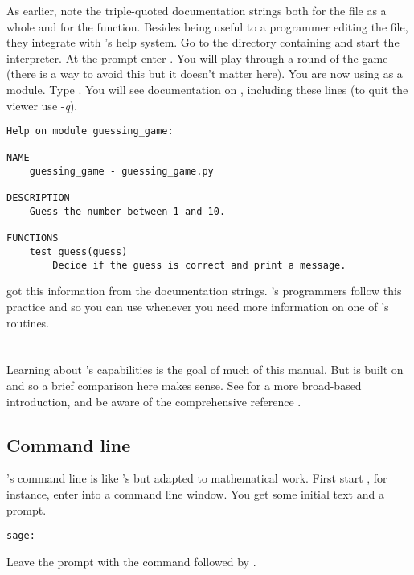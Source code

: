 As earlier, note the triple-quoted documentation strings both for the 
file as a whole and for the function.
Besides being useful to a programmer editing the file, 
they integrate with \python's help system. 
Go to the directory containing  and start 
the \python{} interpreter.
At the \inlinecode{>>>} prompt enter .
You will play through a round of the game (there is a way to avoid this
but it doesn't matter here).
You are now using  as a module.
Type
.
You will see documentation on , 
including these lines
(to quit the viewer use -\textit{q}).
\begin{lstlisting}
Help on module guessing_game:

NAME
    guessing_game - guessing_game.py

DESCRIPTION
    Guess the number between 1 and 10.

FUNCTIONS
    test_guess(guess)
        Decide if the guess is correct and print a message.
\end{lstlisting}
\python{} got this information from the documentation strings.
\Sage's programmers follow this practice and so 
you can use  
whenever you need more information on one of 
\Sage's routines.





\section{\Sage}
Learning about \Sage's capabilities is the goal of much of this manual.
But \Sage{} is built on \python{} and so a brief comparison here makes sense.
See \citep{SageTeam19} for a more broad-based introduction, and 
be aware of the comprehensive reference \citep{SageTeam19ref}.



\subsection{Command line}
\Sage's command line is like \python's but adapted to 
mathematical work.
First start \Sage,
for instance, enter  into a command line window.
You get some initial text and a prompt.
\begin{lstlisting}[style=python]
sage:  
\end{lstlisting}
Leave the prompt with the command 
followed by .

